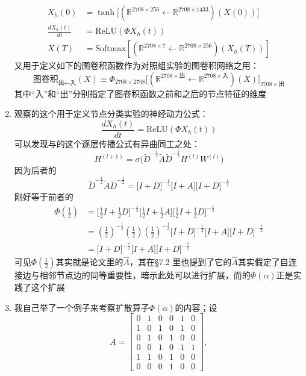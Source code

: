 \documentclass[11pt]{article}
\begin{document}
\begin{enumerate}
\[\begin{split}
X_h(0)&=\tanh\big[(\mathbb{R}^{2708\times256}\leftarrow\mathbb{R}^{2708\times1433})(X(0))\big]\\
\frac{dX_h(t)}{dt}&=\text{ReLU}(\Phi X_h(t))\\
X(T)&=\text{Softmax}[(\mathbb{R}^{2708\times7}\leftarrow\mathbb{R}^{2708\times256})(X_h(T))]
\end{split}
\]又用于定义如下的图卷积函数作为对照组实验的图卷积网络之用：\[
\text{图卷积}_{\text{出}\leftarrow\text{入}}(X)\equiv \Phi_{2708\times2708}\big[(\mathbb{R}^{2708\times\text{出}}\leftarrow\mathbb{R}^{2708\times\text{入}})(X)\big]_{2708\times\text{出}}
\]其中``入''和``出''分别指定了图卷积函数之前和之后的节点特征的维度
\item 观察\cite{zang2019neural}的这个用于定义节点分类实验的神经动力公式：\[
\frac{dX_h(t)}{dt}=\text{ReLU}(\Phi X_h(t))
\]可以发现与\cite{DBLP:journals/corr/KipfW16}的这个逐层传播公式有异曲同工之处：\[
H^{(l+1)}=\sigma\big(\tilde{D}^{-\frac{1}{2}}\tilde{A}\tilde{D}^{-\frac{1}{2}}H^{(l)}W^{(l)}\big)
\]因为后者的\[
\tilde{D}^{-\frac{1}{2}}\tilde{A}\tilde{D}^{-\frac{1}{2}}=\big[I+D\big]^{-\frac{1}{2}}\big[I+A\big]\big[I+D\big]^{-\frac{1}{2}}
\]刚好等于前者的\[
\begin{split}
\Phi(\frac{1}{2})&=\big[\frac{1}{2}I  + \frac{1}{2}D\big]^{-\frac{1}{2}}\big[\frac{1}{2}I +  \frac{1}{2}A\big]\big[\frac{1}{2}I  + \frac{1}{2}D\big]^{-\frac{1}{2}}\\
&=\left(\frac{1}{2}\right)^{-\frac{1}{2}}\left(\frac{1}{2}\right)\left(\frac{1}{2}\right)^{-\frac{1}{2}}\big[I +D\big]^{-\frac{1}{2}}\big[I +  A\big]\big[I  + D\big]^{-\frac{1}{2}}\\
&=\big[I +D\big]^{-\frac{1}{2}}\big[I +  A\big]\big[I  + D\big]^{-\frac{1}{2}}
\end{split}
\]可见$\Phi(\frac{1}{2})$其实就是\cite{DBLP:journals/corr/KipfW16}论文里的$\hat{A}$，其在\S7.2 里也提到了它的$\hat{A}$其实假定了自连接边与相邻节点边的同等重要性，暗示此处可以进行扩展，而\cite{zang2019neural}的$\Phi(\alpha)$正是实践了这个扩展
\item 我自己举了一个例子来考察扩散算子$\Phi(\alpha)$的内容；设\[
A=\begin{bmatrix}
  0 &  1 &  0 &  0 &  1 &  0\\
  1 &  0 &  1 &  0 &  1 &  0\\
  0 &  1 &  0 &  1 &  0 &  0\\
  0 &  0 &  1 &  0 &  1 &  1\\
  1 &  1 &  0 &  1 &  0 &  0\\
  0 &  0 &  0 &  1 &  0 &  0
\end{bmatrix},
\]
\end{enumerate}
\end{document}
